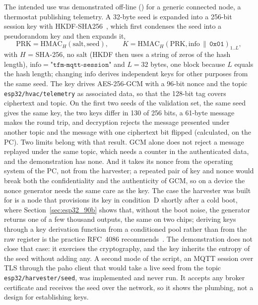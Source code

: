 The intended use was demonstrated off-line
() for a generic connected node,
a thermostat publishing telemetry. A 32-byte seed is expanded into a
256-bit session key with HKDF-SHA256~\cite{krawczyk_2010_hkdf}, which
first condenses the seed into a pseudorandom key and then expands it,
\begin{equation}
\mathrm{PRK} = \mathrm{HMAC}_H(\mathrm{salt}, \mathrm{seed}), \qquad
K = \mathrm{HMAC}_H(\mathrm{PRK}, \mathrm{info} \,\|\, \texttt{0x01})_{1..L},
\label{eq:esp32_hkdf}
\end{equation}
with $H$ = SHA-256, no salt (HKDF then uses a string of zeros of the hash
length), $\mathrm{info} = \texttt{"tfm-mqtt-session"}$ and $L = 32$ bytes,
one block because $L$ equals the hash length; changing
$\mathrm{info}$ derives independent keys for other purposes from the same
seed. The key drives AES-256-GCM with a 96-bit nonce and the topic
\texttt{esp32/hvac/telemetry} as associated data, so that the 128-bit tag
covers ciphertext and topic. On the first two seeds of the validation
set, the same seed gives the same key, the two keys differ in 130 of 256
bits, a 61-byte message makes the round trip, and decryption rejects the
message presented under another topic and the message with one
ciphertext bit flipped (calculated, on the PC). Two limits belong with
that result. GCM alone does not reject a message replayed under the same
topic, which needs a counter in the authenticated data, and the
demonstration has none. And it takes its nonce from the operating system
of the PC, not from the harvester; a repeated pair of key and nonce would
break both the confidentiality and the authenticity of GCM, so on a
device the nonce generator needs the same care as the key. The case the
harvester was built for is a node that provisions its key in condition~D
shortly after a cold boot, where Section~\ref{sec:esp32_90b} shows that,
without the boot noise, the generator returns one of a few thousand
outputs, the same on two chips; deriving keys through a key derivation
function from a conditioned pool rather than from the raw register is the
practice RFC~4086 recommends~\cite{eastlake_2005_rfc4086}. The
demonstration does not close that case: it exercises the cryptography,
and the key inherits the entropy of the seed without adding any. A second
mode of the script, an MQTT session over TLS through the paho client that
would take a live seed from the topic \texttt{esp32/harvester/seed}, was
implemented and never run. It accepts any broker certificate and receives
the seed over the network, so it shows the plumbing, not a design for
establishing keys.

